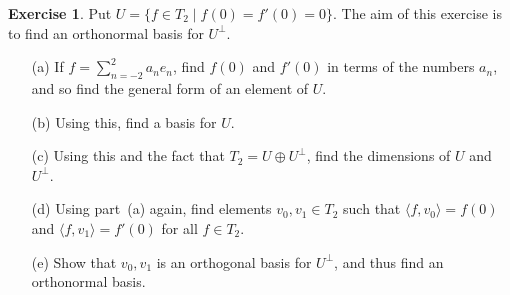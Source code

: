 \documentclass{amsart}
\newcommand{\st}        {\;|\;}
\newcommand{\ip}[1]     {\langle #1\rangle}
\newcommand{\op}        {\oplus}
\renewcommand{\:}       {\colon}
\theoremstyle{definition}
\newtheorem{exercise}{Exercise}[section]
\begin{document}
\begin{exercise}\label{ex-square-perp}
 Put $U=\{f\in T_2\st f(0)=f'(0)=0\}$.  The aim of this exercise is to
 find an orthonormal basis for $U^\perp$.
 \begin{itemize}
  \item[(a)] If $f=\sum_{n=-2}^2a_ne_n$, find $f(0)$ and $f'(0)$ in
   terms of the numbers $a_n$, and so find the general form of an
   element of $U$.
  \item[(b)] Using this, find a basis for $U$.
  \item[(c)] Using this and the fact that $T_2=U\op U^\perp$, find the
   dimensions of $U$ and $U^\perp$.
  \item[(d)] Using part~(a) again, find elements $v_0,v_1\in T_2$ such
   that $\ip{f,v_0}=f(0)$ and $\ip{f,v_1}=f'(0)$ for all $f\in T_2$. 
  \item[(e)] Show that $v_0,v_1$ is an orthogonal basis for $U^\perp$,
   and thus find an orthonormal basis.
 \end{itemize}
\end{exercise}
\end{document}
